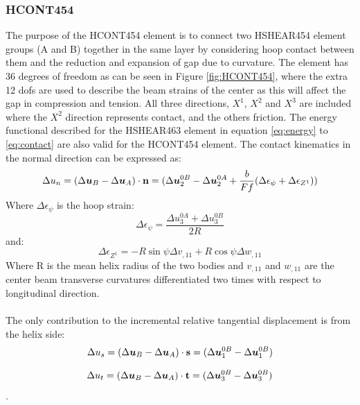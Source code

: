 \subsubsection{HCONT454}
The purpose of the HCONT454 element is to connect two HSHEAR454 element groups (A and B) together in the same layer by considering hoop contact between them and the reduction and expansion of gap due to curvature. The element has 36 degrees of freedom as can be seen in Figure \ref{fig:HCONT454},  where the extra 12 dofs are used to describe the beam strains of the center as this will affect the gap in compression and tension. All three directions, $X^1$, $X^2$ and $X^3$ are included where the $X^2$ direction represents contact, and the others friction. The energy functional described for the HSHEAR463 element in equation \ref{eq:energy} to \ref{eq:contact} are also valid for the HCONT454 element. The contact kinematics in the normal direction can be expressed as: 
\begin{equation}
    \Delta u_n=(\Delta \boldsymbol{u}_B-\Delta \boldsymbol{u}_A) \cdot \bold{n}=(\Delta \boldsymbol{u}_2^{0B}-\Delta \boldsymbol{u}_2^{0A}+\frac{b}{Ff}(\Delta \epsilon_\psi+\Delta \epsilon_{Z^1}))
\end{equation}
\noindent Where $ \Delta \epsilon_\psi$ is the hoop strain:
\begin{equation}
    \Delta \epsilon_\psi =\frac{\Delta u_3^{0A} + \Delta u_3^{0B}}{2R}
\end{equation}
and:
\begin{equation}
    \Delta \epsilon_{Z^1} = -R \sin \psi \Delta v_{,11} + R \cos \psi \Delta w_{,11}
\end{equation}
Where R is the mean helix radius of the two bodies and $v_{,11}$ and $w_{,11}$ are the center beam transverse curvatures differentiated  two times with respect to longitudinal direction. \\\\ The only contribution to the  incremental relative tangential displacement is from the helix side:
\begin{equation}
    \Delta u_s = (\Delta \boldsymbol{u}_B -\Delta \boldsymbol{u}_A) \cdot \bold{s}=(\Delta \boldsymbol{u}_1^{0B} -\Delta \boldsymbol{u}_1^{0B})
\end{equation}

\begin{equation}
    \Delta u_t = (\Delta \boldsymbol{u}_B -\Delta \boldsymbol{u}_A) \cdot \bold{t}=(\Delta \boldsymbol{u}_3^{0B} -\Delta \boldsymbol{u}_3^{0B})
\end{equation}. 

